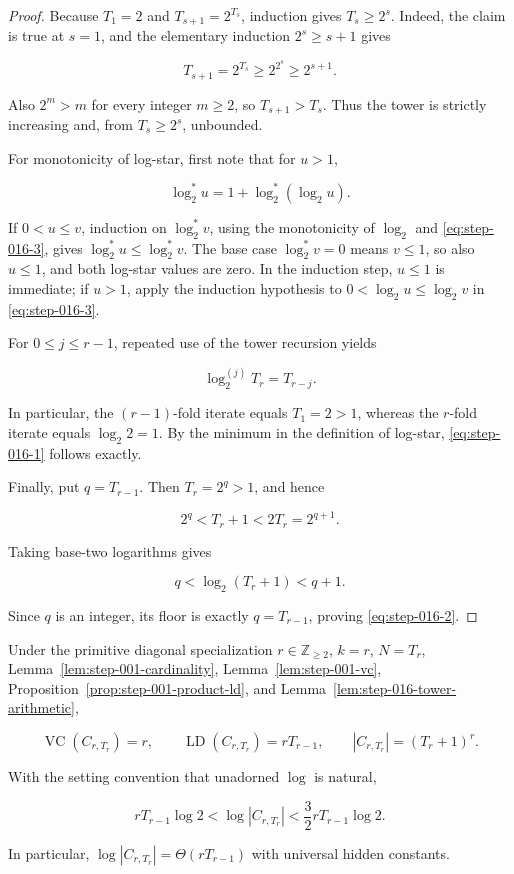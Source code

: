 \begin{proof}
Because \(T_1=2\) and \(T_{s+1}=2^{T_s}\), induction gives
\(T_s\ge2^s\). Indeed, the claim is true at \(s=1\), and the elementary
induction \(2^s\ge s+1\) gives

\[
T_{s+1}=2^{T_s}\ge2^{2^s}\ge2^{s+1}.
\]

Also \(2^m>m\) for every integer \(m\ge2\), so
\(T_{s+1}>T_s\). Thus the tower is strictly increasing and, from
\(T_s\ge2^s\), unbounded.

For monotonicity of log-star, first note that for \(u>1\),

\[
\log_2^*u=1+\log_2^*(\log_2u).
\tag{S16.3}\label{eq:step-016-3}
\]

If \(0<u\le v\), induction on \(\log_2^*v\), using the monotonicity of
\(\log_2\) and \eqref{eq:step-016-3}, gives \(\log_2^*u\le\log_2^*v\). The base case
\(\log_2^*v=0\) means \(v\le1\), so also \(u\le1\), and both log-star
values are zero. In the induction step, \(u\le1\) is immediate; if
\(u>1\), apply the induction hypothesis to
\(0<\log_2u\le\log_2v\) in \eqref{eq:step-016-3}.

For \(0\le j\le r-1\), repeated use of the tower recursion yields

\[
\log_2^{(j)}T_r=T_{r-j}.
\tag{S16.4}\label{eq:step-016-4}
\]

In particular, the \((r-1)\)-fold iterate equals \(T_1=2>1\), whereas
the \(r\)-fold iterate equals \(\log_2 2=1\). By the minimum in the
definition of log-star, \eqref{eq:step-016-1} follows exactly.

Finally, put \(q=T_{r-1}\). Then \(T_r=2^q>1\), and hence

\[
2^q<T_r+1<2T_r=2^{q+1}.
\]

Taking base-two logarithms gives

\[
q<\log_2(T_r+1)<q+1.
\]

Since \(q\) is an integer, its floor is exactly \(q=T_{r-1}\), proving
\eqref{eq:step-016-2}. \end{proof}

\begin{proposition}\label{prop:step-016-structural-diagonal}
Under the primitive diagonal specialization \(r\in\mathbb Z_{\ge2}\),
\(k=r\), \(N=T_r\), Lemma~\ref{lem:step-001-cardinality}, Lemma~\ref{lem:step-001-vc}, Proposition~\ref{prop:step-001-product-ld}, and
Lemma~\ref{lem:step-016-tower-arithmetic},

\[
\operatorname{VC}(C_{r,T_r})=r,
\qquad
\operatorname{LD}(C_{r,T_r})=rT_{r-1},
\qquad
|C_{r,T_r}|=(T_r+1)^r.
\tag{S16.5}\label{eq:step-016-5}
\]

With the setting convention that unadorned \(\log\) is natural,

\[
rT_{r-1}\log2
  <\log|C_{r,T_r}|
  <\frac32rT_{r-1}\log2.
\tag{S16.6}\label{eq:step-016-6}
\]

In particular,
\(\log|C_{r,T_r}|=\Theta(rT_{r-1})\) with universal hidden constants.
\end{proposition}

